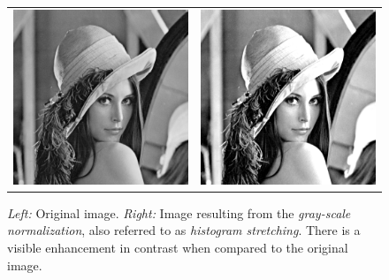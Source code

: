 \documentclass[a4paper,twocolumn]{article}
\begin{document}
	\begin{figure} [t]
		\centering
		\begin{tabular}{c c}
			\includegraphics[width=0.8\columnwidth]{figures/original.png}
			&
			\includegraphics[width=0.8\columnwidth]{figures/normalized.png}
		\end{tabular}
		\caption{\textit{Left:} Original image. \textit{Right:} Image resulting from the \textit{gray-scale normalization}, also referred to as \textit{histogram stretching}. There is a visible enhancement in contrast when compared to the original image.}
		\label{fig:task_2a}
	\end{figure}
	
\end{document}
